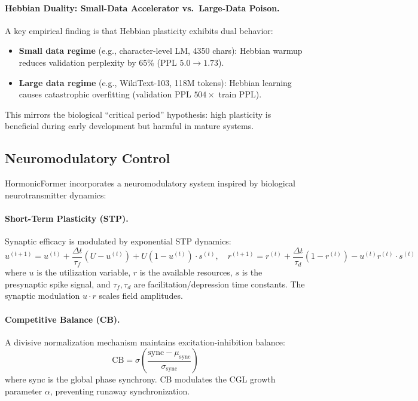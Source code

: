 \paragraph{Hebbian Duality: Small-Data Accelerator vs.\ Large-Data Poison.}
A key empirical finding is that Hebbian plasticity exhibits dual behavior:
\begin{itemize}
\item \textbf{Small data regime} (e.g., character-level LM, 4350 chars): Hebbian warmup reduces validation perplexity by 65\% (PPL $5.0 \to 1.73$).
\item \textbf{Large data regime} (e.g., WikiText-103, 118M tokens): Hebbian learning causes catastrophic overfitting (validation PPL $504\times$ train PPL).
\end{itemize}
This mirrors the biological ``critical period'' hypothesis: high plasticity is beneficial during early development but harmful in mature systems.

\subsection{Neuromodulatory Control}

HormonicFormer incorporates a neuromodulatory system inspired by biological neurotransmitter dynamics:

\paragraph{Short-Term Plasticity (STP).}
Synaptic efficacy is modulated by exponential STP dynamics:
\begin{equation}
u^{(t+1)} = u^{(t)} + \frac{\Delta t}{\tau_f}(U - u^{(t)}) + U(1 - u^{(t)}) \cdot s^{(t)}, \quad
r^{(t+1)} = r^{(t)} + \frac{\Delta t}{\tau_d}(1 - r^{(t)}) - u^{(t)} r^{(t)} \cdot s^{(t)}
\end{equation}
where $u$ is the utilization variable, $r$ is the available resources, $s$ is the presynaptic spike signal, and $\tau_f, \tau_d$ are facilitation/depression time constants. The synaptic modulation $u \cdot r$ scales field amplitudes.

\paragraph{Competitive Balance (CB).}
A divisive normalization mechanism maintains excitation-inhibition balance:
\begin{equation}
\text{CB} = \sigma\left(\frac{\text{sync} - \mu_{\text{sync}}}{\sigma_{\text{sync}}}\right)
\end{equation}
where sync is the global phase synchrony. CB modulates the CGL growth parameter $\alpha$, preventing runaway synchronization.

